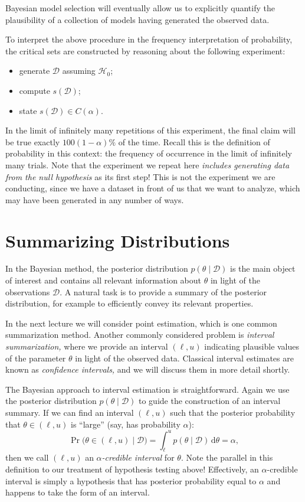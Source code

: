 \documentclass{article}
\newcommand{\given}{\mid}
\newcommand{\mc}[1]{\mathcal{#1}}
\newcommand{\data}{\mc{D}}
\newcommand{\intd}[1]{\,\mathrm{d}{#1}}
\begin{document}
Bayesian model selection will eventually allow us to explicitly quantify the
plausibility of a collection of models having generated the observed data.

To interpret the above procedure in the frequency interpretation of probability,
the critical sets are constructed by reasoning about the following experiment:
\begin{itemize}
\item
  generate $\data$ assuming $\mc{H}_0$;
\item
  compute $s(\data)$;
\item
  state $s(\data) \in C(\alpha)$.
\end{itemize}
In the limit of infinitely many repetitions of this experiment, the final claim
will be true exactly $100(1 - \alpha)\%$ of the time. Recall this is the
definition of probability in this context: the frequency of occurrence in the
limit of infinitely many trials. Note that the experiment we repeat here
\emph{includes generating data from the null hypothesis} as its first step! This
is not the experiment we are conducting, since we have a dataset in front of us
that we want to analyze, which may have been generated in any number of ways.

\section*{Summarizing Distributions}

In the Bayesian method, the posterior distribution $p(\theta \given \data)$ is
the main object of interest and contains all relevant information about $\theta$
in light of the observations $\data$.  A natural task is to provide a summary of
the posterior distribution, for example to efficiently convey its relevant
properties.

In the next lecture we will consider point estimation, which is one common
summarization method. Another commonly considered problem is \emph{interval
  summarization,} where we provide an interval $(\ell, u)$ indicating plausible
values of the parameter $\theta$ in light of the observed data. Classical
interval estimates are known as \emph{confidence intervals,} and we will discuss
them in more detail shortly.

The Bayesian approach to interval estimation is straightforward. Again we use
the posterior distribution $p(\theta \given \data)$ to guide the construction of
an interval summary. If we can find an interval $(\ell, u)$ such that the
posterior probability that $\theta \in (\ell, u)$ is ``large'' (say, has
probability $\alpha$):
\[
  \Pr\bigl(\theta \in (\ell, u) \given \data\bigr)
  =
  \int_\ell^u p(\theta \given \data) \intd\theta
  =
  \alpha,
\]
then we call $(\ell, u)$ an $\alpha$\emph{-credible interval} for $\theta$.
Note the parallel in this definition to our treatment of hypothesis testing
above! Effectively, an $\alpha$-credible interval is simply a hypothesis that
has posterior probability equal to $\alpha$ and happens to take the form of an
interval.
\end{document}
